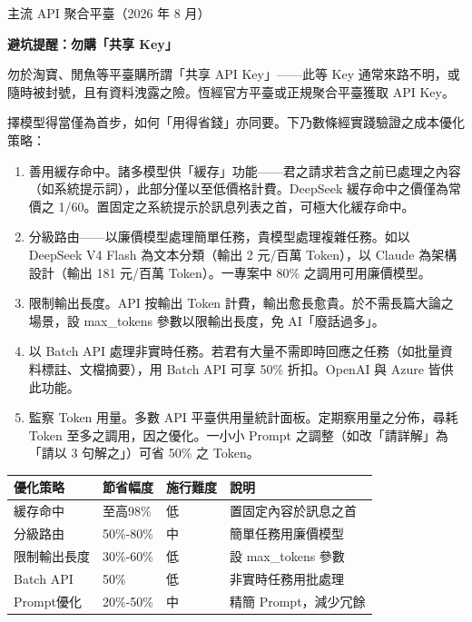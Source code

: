 \begin{center}\small\color{gray}主流 API 聚合平臺（2026 年 8 月）\end{center}

\textbf{避坑提醒：勿購「共享 Key」}\par

勿於淘寶、閒魚等平臺購所謂「共享 API Key」——此等 Key 通常來路不明，或隨時被封號，且有資料洩露之險。恆經官方平臺或正規聚合平臺獲取 API Key。


擇模型得當僅為首步，如何「用得省錢」亦同要。下乃數條經實踐驗證之成本優化策略：

\begin{enumerate}
  \item 善用緩存命中。諸多模型供「緩存」功能——君之請求若含之前已處理之內容（如系統提示詞），此部分僅以至低價格計費。DeepSeek 緩存命中之價僅為常價之 1/60。置固定之系統提示於訊息列表之首，可極大化緩存命中。
  \item 分級路由——以廉價模型處理簡單任務，貴模型處理複雜任務。如以 DeepSeek V4 Flash 為文本分類（輸出 2 元/百萬 Token），以 Claude 為架構設計（輸出 181 元/百萬 Token）。一專案中 80\% 之調用可用廉價模型。
  \item 限制輸出長度。API 按輸出 Token 計費，輸出愈長愈貴。於不需長篇大論之場景，設 max\_tokens 參數以限輸出長度，免 AI「廢話過多」。
  \item 以 Batch API 處理非實時任務。若君有大量不需即時回應之任務（如批量資料標註、文檔摘要），用 Batch API 可享 50\% 折扣。OpenAI 與 Azure 皆供此功能。
  \item 監察 Token 用量。多數 API 平臺供用量統計面板。定期察用量之分佈，尋耗 Token 至多之調用，因之優化。一小小 Prompt 之調整（如改「請詳解」為「請以 3 句解之」）可省 50\% 之 Token。
\end{enumerate}

\begin{center}
\begin{tabularx}{\linewidth}{|X|X|X|X|}
\hline
\textbf{優化策略} & \textbf{節省幅度} & \textbf{施行難度} & \textbf{說明} \tabularnewline
\hline
緩存命中 & 至高98\% & 低 & 置固定內容於訊息之首 \tabularnewline
分級路由 & 50\%-80\% & 中 & 簡單任務用廉價模型 \tabularnewline
限制輸出長度 & 30\%-60\% & 低 & 設 max\_tokens 參數 \tabularnewline
Batch API & 50\% & 低 & 非實時任務用批處理 \tabularnewline
Prompt優化 & 20\%-50\% & 中 & 精簡 Prompt，減少冗餘 \tabularnewline
\hline
\end{tabularx}
\end{center}

